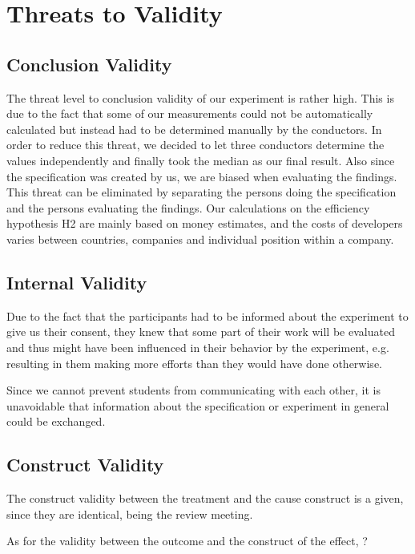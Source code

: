 \section{Threats to Validity}

\subsection{Conclusion Validity}

The threat level to conclusion validity of our experiment is rather high. This is due to the fact
that some of our measurements could not be automatically calculated but instead had to be determined
manually by the conductors. In order to reduce this threat, we decided to let three conductors
determine the values independently and finally took the median as our final result.
Also since the specification was created by us, we are biased when evaluating the findings. This threat can be eliminated by separating the persons doing the specification and the persons evaluating the findings.
Our calculations on the efficiency hypothesis H2 are mainly based on money estimates, and the costs of developers varies between countries, companies and individual position within a company.

\subsection{Internal Validity}

Due to the fact that the participants had to be informed about the experiment to give us their
consent, they knew that some part of their work will be evaluated and thus might have been
influenced in their behavior by the experiment, e.g. resulting in them making more efforts than they would have done otherwise.

Since we cannot prevent students from communicating with each other, it is unavoidable that information about the specification or experiment in general could be exchanged.

\subsection{Construct Validity}

The construct validity between the treatment and the cause construct is a given, since they are identical, being the review meeting.

As for the validity between the outcome and the construct of the effect, ?

